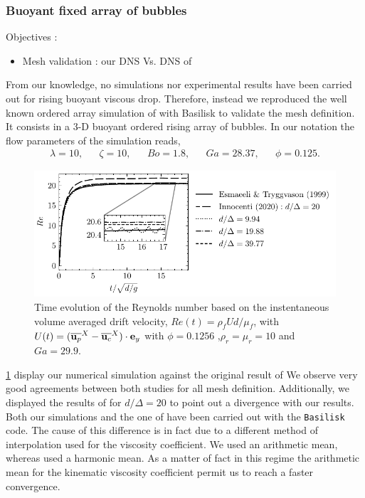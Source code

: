 \subsubsection{Buoyant fixed array of bubbles}
Objectives :
\begin{itemize}
    \item Mesh validation : our DNS Vs. DNS of \cite{esmaeeli1999direct}
\end{itemize}
From our knowledge, no simulations nor experimental results have been carried out for rising buoyant viscous drop. 
Therefore, instead we reproduced the well known ordered array simulation of \citet{esmaeeli1999direct} with Basilisk to validate the mesh definition.  
It consists in a 3-D buoyant ordered rising array of bubbles. 
In our notation the flow parameters of the simulation reads, 
\begin{align*}
    \lambda = 10,
    && \zeta = 10,
    && Bo = 1.8,
    && Ga = 28.37,
    && \phi = 0.125.
\end{align*}
\begin{figure}[h!]
    \centering
    \includegraphics[height = 0.3\textwidth]{image/VALIDATION2.0/Loisy/Re.pdf}
    \caption{Time evolution of the Reynolds number based on the instentaneous volume averaged drift velocity, $Re(t) = \rho_fU d /\mu_f$, with $U(t) = (\overline{\textbf{u}_p}^X - \overline{\textbf{u}_c}^X)\cdot \textbf{e}_y$ with $\phi = 0.1256$ ,$\rho_r =\mu_r =10$ and $Ga = 29.9$.}
    \label{fig:ordered_array}
\end{figure}
\ref{fig:ordered_array} display our numerical simulation against the original result of \citet{esmaeeli1999direct}
We observe very good agreements between both studies for all mesh definition.
Additionally, we displayed the results of \citet{innocenti2020direct} for $d/\Delta = 20$ to point out a divergence with our results.  
Both our simulations and the one of \citet{innocenti2020direct} have been carried out with the  \texttt{Basilisk} code. 
The cause of this difference is in fact due to a different method of interpolation used for the viscosity coefficient. 
We used an arithmetic mean, whereas \citet{innocenti2020direct} used a 
harmonic mean. 
As a matter of fact in this regime the arithmetic mean for the kinematic viscosity coefficient permit us to reach a faster convergence. 

